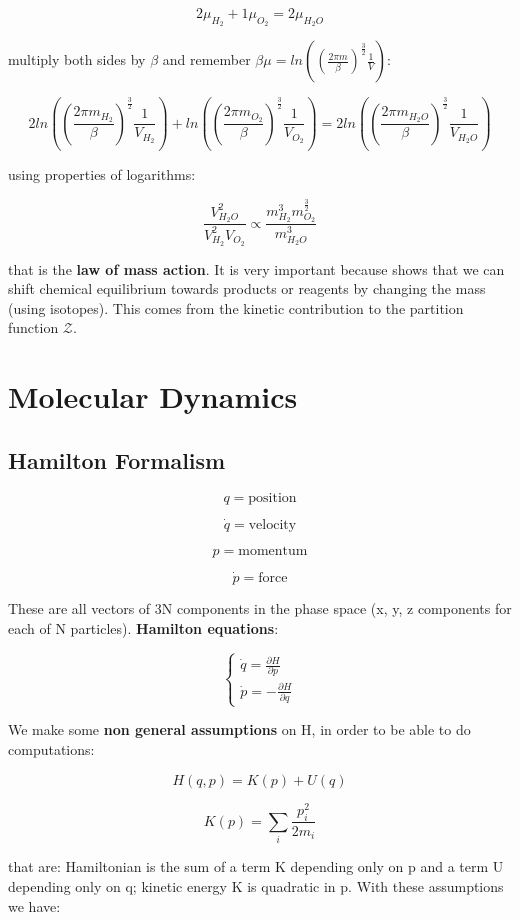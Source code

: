 \documentclass[a4paper, italian, openany]{book}
\begin{document}
$$2 \mu_{H_2} + 1\mu_{O_2} = 2\mu_{H_2O}$$

multiply both sides by $\beta$ and remember $\beta \mu = ln \left ( \left ( \frac{2\pi m}{\beta} \right )^{\frac{3}{2}} \frac{1}{V} \right )$:

$$2 ln \left ( \left ( \frac{2\pi m_{H_2}}{\beta} \right )^{\frac{3}{2}} \frac{1}{V_{H_2}} \right ) + ln \left ( \left ( \frac{2\pi m_{O_2}}{\beta} \right )^{\frac{3}{2}} \frac{1}{V_{O_2}} \right ) = 2ln \left ( \left ( \frac{2\pi m_{H_2O}}{\beta} \right )^{\frac{3}{2}} \frac{1}{V_{H_2O}} \right )$$

using properties of logarithms:

$$\frac{V_{H_2O}^2}{V_{H_2}^2V_{O_2}} \propto \frac{m_{H_2}^3 m_{O_2}^\frac{3}{2}}{m_{H_2O}^3}$$

that is the \textbf{law of mass action}. It is very important because shows that we can shift chemical equilibrium towards products or reagents by changing the mass (using isotopes). This comes from the kinetic contribution to the partition function $\mathcal{Z}$.

\chapter{Molecular Dynamics}

\section{Hamilton Formalism}

$$q = \mbox{position}$$

$$\dot{q} = \mbox{velocity}$$

$$p = \mbox{momentum}$$

$$\dot{p} = \mbox{force}$$

These are all vectors of 3N components in the phase space (x, y, z components for each of N particles). \textbf{Hamilton equations}:

$$\begin{cases}
\dot{q} = \frac{\partial H }{\partial p} \\
\dot{p} = - \frac{\partial H}{\partial q}
\end{cases}$$

We make some \textbf{non general assumptions} on H, in order to be able to do computations:

$$H(q, p) = K(p) + U(q)$$

$$K(p) = \sum_i \frac{p_i^2}{2m_i}$$

that are: Hamiltonian is the sum of a term K depending only on p and a term U depending only on q; kinetic energy K is quadratic in p. With these assumptions we have:
\end{document}
